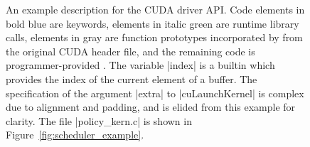 \begin{figure}
{An example \speclang description for the CUDA driver API.
Code elements in {\lapiskeywordstyle bold blue} are \speclang keywords, elements in {\lapisstdlibstyle italic green} are runtime library calls, 
elements in {\lapisprototypestyle gray} are function prototypes incorporated by \compiler from the original CUDA header file,
and the remaining code is programmer-provided \speclang.
The variable \spec|index| is a \speclang builtin which provides the index of the current element of a buffer.
The specification of the argument \spec|extra| to \spec|cuLaunchKernel| is complex due to alignment and padding, and is elided from this example for clarity. 
The file \spec|policy_kern.c| is shown in Figure~\ref{fig:scheduler_example}.
}
\label{fig:lapis-values-example}
\label{fig:spec_example}
\vspace*{-0.5em}
\end{figure}
